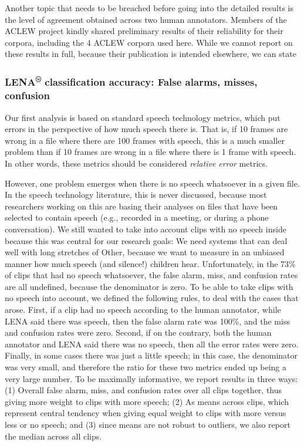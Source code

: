 \documentclass[english,table,man,floatsintext]{apa6}
\begin{document}
Another topic that needs to be breached before going into the detailed results is the level of agreement obtained across two human annotators. Members of the ACLEW project kindly shared preliminary results of their reliability for their corpora, including the 4 ACLEW corpora used here. While we cannot report on these results in full, because their publication is intended elsewhere, we can state

\hypertarget{lena-classification-accuracy-false-alarms-misses-confusion}{%
\subsubsection{\texorpdfstring{LENA\textsuperscript{®} classification accuracy: False alarms, misses, confusion}{LENA® classification accuracy: False alarms, misses, confusion}}\label{lena-classification-accuracy-false-alarms-misses-confusion}}

Our first analysis is based on standard speech technology metrics, which put errors in the perspective of how much speech there is. That is, if 10 frames are wrong in a file where there are 100 frames with speech, this is a much smaller problem than if 10 frames are wrong in a file where there is 1 frame with speech. In other words, these metrics should be considered \emph{relative error} metrics.

However, one problem emerges when there is no speech whatsoever in a given file. In the speech technology literature, this is never discussed, because most researchers working on this are basing their analyses on files that have been selected to contain speech (e.g., recorded in a meeting, or during a phone conversation). We still wanted to take into account clips with no speech inside because this was central for our research goals: We need systems that can deal well with long stretches of Other, because we want to measure in an unbiased manner how much speech (and silence!) children hear. Unfortunately, in the 73\% of clips that had no speech whatsoever, the false alarm, miss, and confusion rates are all undefined, because the denominator is zero.
To be able to take clips with no speech into account, we defined the following rules, to deal with the cases that arose. First, if a clip had no speech according to the human annotator, while LENA said there was speech, then the false alarm rate was 100\%, and the miss and confusion rates were zero. Second, if on the contrary, both the human annotator and LENA said there was no speech, then all the error rates were zero. Finally, in some cases there was just a little speech; in this case, the denominator was very small, and therefore the ratio for these two metrics ended up being a very large number. To be maximally informative, we report results in three ways: (1) Overall false alarm, miss, and confusion rates over all clips together, thus giving more weight to clips with more speech; (2) As means across clips, which represent central tendency when giving equal weight to clips with more versus less or no speech; and (3) since means are not robust to outliers, we also report the median across all clips.
\end{document}
